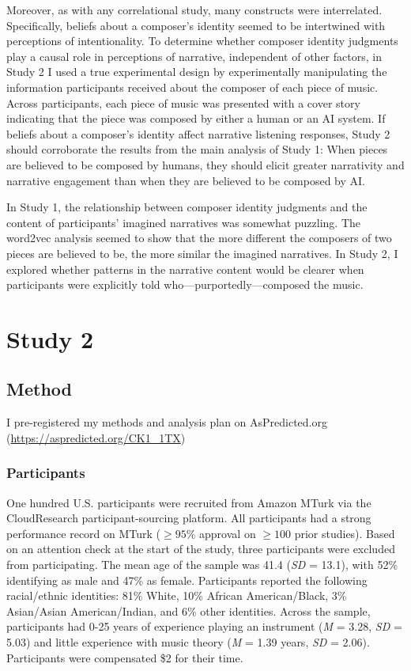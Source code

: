 \documentclass[12pt,twoside]{reedthesis}
\begin{document}
Moreover, as with any correlational study, many constructs were interrelated. Specifically, beliefs about a composer’s identity seemed to be intertwined with perceptions of intentionality. To determine whether composer identity judgments play a causal role in perceptions of narrative, independent of other factors, in Study 2 I used a true experimental design by experimentally manipulating the information participants received about the composer of each piece of music. Across participants, each piece of music was presented with a cover story indicating that the piece was composed by either a human or an AI system. If beliefs about a composer’s identity affect narrative listening responses, Study 2 should corroborate the results from the main analysis of Study 1: When pieces are believed to be composed by humans, they should elicit greater narrativity and narrative engagement than when they are believed to be composed by AI. 

In Study 1, the relationship between composer identity judgments and the content of participants’ imagined narratives was somewhat puzzling. The word2vec analysis seemed to show that the more different the composers of two pieces are believed to be, the more similar the imagined narratives. In Study 2, I explored whether patterns in the narrative content would be clearer when participants were explicitly told who—purportedly—composed the music.

\chapter*{Study 2}

\section*{Method}
I pre-registered my methods and analysis plan on AsPredicted.org (\url{https://aspredicted.org/CK1_1TX})
\subsection*{Participants}

One hundred U.S. participants were recruited from Amazon MTurk via the CloudResearch participant-sourcing platform. All participants had a strong performance record on MTurk ($\ge95\%$ approval on $\ge100$ prior studies). Based on an attention check at the start of the study, three participants were excluded from participating. The mean age of the sample was 41.4 (\emph{SD} = 13.1), with 52\% identifying as male and 47\% as female. Participants reported the following racial/ethnic identities: 81\% White, 10\% African American/Black, 3\% Asian/Asian American/Indian, and 6\% other identities. Across the sample, participants had 0-25 years of experience playing an instrument (\emph{M} = 3.28, \emph{SD} = 5.03) and little experience with music theory (\emph{M} = 1.39 years, \emph{SD} = 2.06). Participants were compensated \$2 for their time. 
\end{document}
